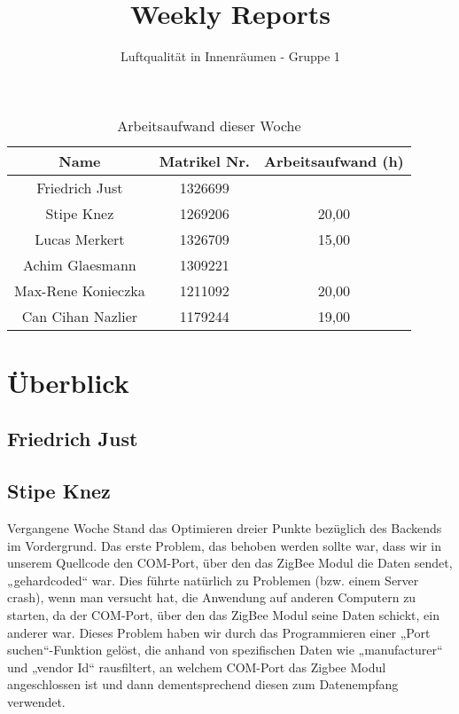 \documentclass[]{article}
\title{Weekly Reports}
\author{Luftqualität in Innenräumen - Gruppe 1}
\begin{document}
\maketitle

\begin{table}[h!]
	\centering
	\begin{tabular}{|c|c|c|}
		\hline
		{\textbf{Name}}				&		{\textbf{Matrikel Nr.}} & {\textbf{Arbeitsaufwand (h)}} \\
		\hline
		Friedrich Just				&		1326699 				&		\\
		\hline
		Stipe Knez					&		1269206 				&	20,00	\\
		\hline
		Lucas Merkert				&		1326709					&	15,00	\\
		\hline
		Achim Glaesmann				&		1309221					&		\\
		\hline
		Max-Rene Konieczka			&		1211092					&	20,00	\\
		\hline
		Can Cihan Nazlier			&		1179244					&	19,00	\\
		\hline
	\end{tabular}
	\caption{Arbeitsaufwand dieser Woche}
	\label{tab:worakload}
\end{table}



\section{Überblick}


\subsection{Friedrich Just}




\subsection{Stipe Knez}
Vergangene Woche Stand das Optimieren dreier Punkte bezüglich des Backends im Vordergrund. Das erste Problem, das behoben werden sollte war, dass wir in unserem Quellcode den COM-Port, über den das ZigBee Modul die Daten sendet, „gehardcoded“ war. Dies führte natürlich zu Problemen (bzw. einem Server crash), wenn man versucht hat, die Anwendung auf anderen Computern zu starten, da der COM-Port, über den das ZigBee Modul seine Daten schickt, ein anderer war. Dieses Problem haben wir durch das Programmieren einer „Port suchen“-Funktion gelöst, die anhand von spezifischen Daten wie „manufacturer“ und „vendor Id“ rausfiltert, an welchem COM-Port das Zigbee Modul angeschlossen ist und dann dementsprechend diesen zum Datenempfang verwendet.
\end{document}
